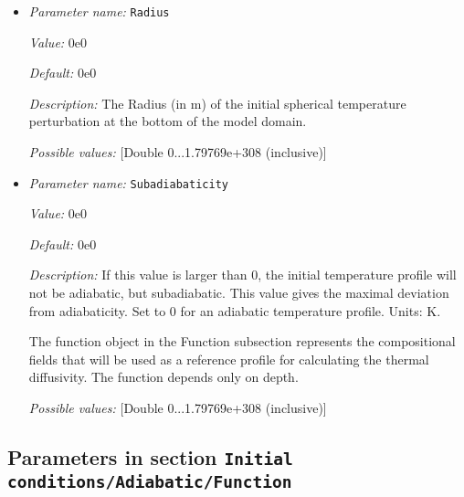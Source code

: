 \begin{itemize}
{\it Value:} center


{\it Default:} center


{\it Description:} Where the initial temperature perturbation should be placed. If 'center' is given, then the perturbation will be centered along a 'midpoint' of some sort of the bottom boundary. For example, in the case of a box geometry, this is the center of the bottom face; in the case of a spherical shell geometry, it is along the inner surface halfway between the bounding radial lines.


{\it Possible values:} [Selection center ]
\item {\it Parameter name:} {\tt Radius}


{\it Value:} 0e0


{\it Default:} 0e0


{\it Description:} The Radius (in m) of the initial spherical temperature perturbation at the bottom of the model domain.


{\it Possible values:} [Double 0...1.79769e+308 (inclusive)]
\item {\it Parameter name:} {\tt Subadiabaticity}


{\it Value:} 0e0


{\it Default:} 0e0


{\it Description:} If this value is larger than 0, the initial temperature profile will not be adiabatic, but subadiabatic. This value gives the maximal deviation from adiabaticity. Set to 0 for an adiabatic temperature profile. Units: K.

The function object in the Function subsection represents the compositional fields that will be used as a reference profile for calculating the thermal diffusivity. The function depends only on depth.


{\it Possible values:} [Double 0...1.79769e+308 (inclusive)]
\end{itemize}



\subsection{Parameters in section \tt Initial conditions/Adiabatic/Function}
\label{parameters:Initial_20conditions/Adiabatic/Function}

